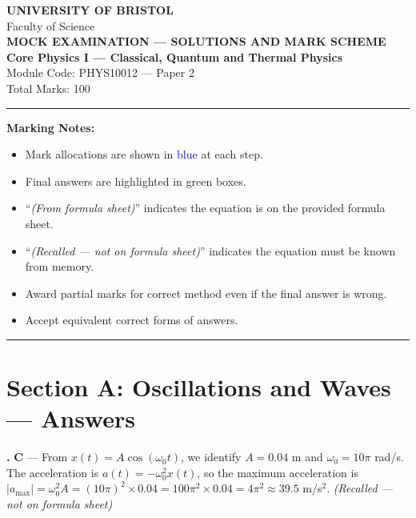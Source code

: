 \documentclass[12pt,a4paper]{article}
\newcommand{\fromsheet}{\textit{(From formula sheet)}}
\newcommand{\recalled}{\textit{(Recalled --- not on formula sheet)}}
\newcounter{mcqcounter}
\newcommand{\mcqanswer}[2]{%
  \stepcounter{mcqcounter}%
  \noindent\textbf{\themcqcounter.} \textbf{#1} --- #2\\[0.2cm]%
}
\begin{document}
\begin{center}
{\Large\textbf{UNIVERSITY OF BRISTOL}}\\[0.3cm]
{\large Faculty of Science}\\[0.5cm]
{\Large\textbf{MOCK EXAMINATION --- SOLUTIONS AND MARK SCHEME}}\\[0.3cm]
{\large\textbf{Core Physics I --- Classical, Quantum and Thermal Physics}}\\[0.2cm]
{\large Module Code: PHYS10012 --- Paper 2}\\[0.5cm]
{\large Total Marks: 100}\\[0.3cm]
\end{center}

\noindent\rule{\textwidth}{0.4pt}

\vspace{0.3cm}
\noindent\textbf{Marking Notes:}
\begin{itemize}[itemsep=0.1cm]
\item Mark allocations are shown in \textcolor{blue}{blue} at each step.
\item Final answers are highlighted in green boxes.
\item ``\fromsheet'' indicates the equation is on the provided formula sheet.
\item ``\recalled'' indicates the equation must be known from memory.
\item Award partial marks for correct method even if the final answer is wrong.
\item Accept equivalent correct forms of answers.
\end{itemize}

\noindent\rule{\textwidth}{0.4pt}
\newpage

\section*{Section A: Oscillations and Waves --- Answers}

\setcounter{mcqcounter}{0}

\mcqanswer{C}{From $x(t) = A\cos(\omega_0 t)$, we identify $A = 0.04$ m and $\omega_0 = 10\pi$ rad/s. The acceleration is $a(t) = -\omega_0^2 x(t)$, so the maximum acceleration is $|a_{\max}| = \omega_0^2 A = (10\pi)^2 \times 0.04 = 100\pi^2 \times 0.04 = 4\pi^2 \approx 39.5$ m/s$^2$. \recalled}
\end{document}
